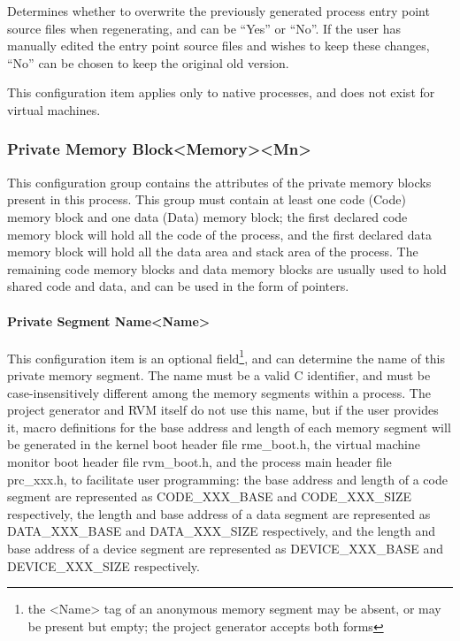 Determines whether to overwrite the previously generated process entry point source files when regenerating, and can be ``Yes'' or ``No''. If the user has manually edited the entry point source files and wishes to keep these changes, ``No'' can be chosen to keep the original old version.

This configuration item applies only to native processes, and does not exist for virtual machines.

\subsubsection{Private Memory Block<Memory><Mn>{}}\label{subsubsec:5-3-14-14}

This configuration group contains the attributes of the private memory blocks present in this process. This group must contain at least one code (Code) memory block and one data (Data) memory block; the first declared code memory block will hold all the code of the process, and the first declared data memory block will hold all the data area and stack area of the process. The remaining code memory blocks and data memory blocks are usually used to hold shared code and data, and can be used in the form of pointers.

\paragraph{Private Segment Name<Name>{}}\label{par:5-3-14-14-1}

This configuration item is an optional field\footnote{the <Name> tag of an anonymous memory segment may be absent, or may be present but empty; the project generator accepts both forms}, and can determine the name of this private memory segment. The name must be a valid C identifier, and must be case-insensitively different among the memory segments within a process. The project generator and RVM itself do not use this name, but if the user provides it, macro definitions for the base address and length of each memory segment will be generated in the kernel boot header file rme\_boot.h, the virtual machine monitor boot header file rvm\_boot.h, and the process main header file prc\_xxx.h, to facilitate user programming: the base address and length of a code segment are represented as CODE\_XXX\_BASE and CODE\_XXX\_SIZE respectively, the length and base address of a data segment are represented as DATA\_XXX\_BASE and DATA\_XXX\_SIZE respectively, and the length and base address of a device segment are represented as DEVICE\_XXX\_BASE and DEVICE\_XXX\_SIZE respectively.

